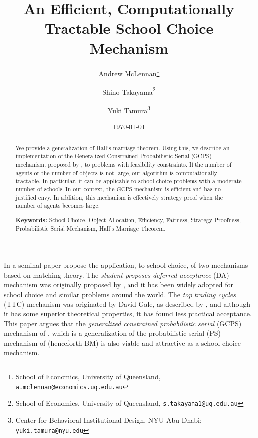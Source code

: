 \documentclass[12pt, A4paper]{article}
\theoremstyle{definition}
\begin{document}
\title{An Efficient, Computationally Tractable School Choice Mechanism}

\author{Andrew McLennan\footnote{School of Economics, University of
    Queensland, {\tt a.mclennan@economics.uq.edu.au}} \and  Shino
Takayama\footnote{School of Economics, University of
  Queensland, {\tt s.takayama1@uq.edu.au}} \and Yuki Tamura\footnote{Center for Behavioral Institutional Design, NYU Abu Dhabi; {\tt yuki.tamura@nyu.edu}}}

\date{\today}

\maketitle

\begin{abstract}
We provide a generalization of Hall’s marriage theorem. Using this, we describe an implementation of the Generalized Constrained Probabilistic Serial (GCPS) mechanism, proposed by \cite{balbuzanov22jet}, to problems with feasibility constraints. If the number of agents or the number of objects is not large, our algorithm is computationally tractable. In particular, it can be applicable to school choice problems with a moderate number of schools. In our context, the GCPS mechanism is efficient and has no justified envy. In addition, this mechanism is effectively strategy proof when the number of agents becomes large.

\smallskip
\noindent \textbf{Keywords:} School Choice, Object Allocation, Efficiency, Fairness, Strategy Proofness, Probabilistic Serial Mechanism, Hall's Marriage Theorem.
\end{abstract}

\medskip

In a seminal paper \cite{as03aer} propose the application, to school choice, of two mechanisms based on matching theory.  The \emph{student proposes deferred acceptance} (DA) mechanism was originally proposed by \cite{GaSh62}, and it has been widely adopted for school choice and similar problems around the world.  The \emph{top trading cycles} (TTC) mechanism was originated by David Gale, as described by \cite{ShSc74}, and although it has some superior theoretical properties, it has found less practical acceptance.  This paper argues that the \emph{generalized constrained probabilistic serial} (GCPS) mechanism of \cite{balbuzanov22jet}, which is a generalization of  the probabilistic serial (PS) mechanism of \cite{bm01} (henceforth BM) is also viable and attractive as a school choice mechanism.
\end{document}
